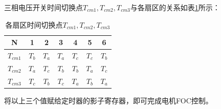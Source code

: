 \documentclass[main.tex]{subfiles}
\begin{document}
三相电压开关时间切换点$T_{cm1}, T_{cm2}, T_{cm3}$与各扇区的关系如表\ref{各扇区时间切换点}所示：

\begin{table}[H]
    \centering
    \begin{tabular}{c|c|c|c|c|c|c}
         \bottomrule
         N & 1 & 2 & 3 & 4 & 5 & 6 \\
         \hline
         $T_{cm1}$ & $T_b$ & $T_a$ & $T_a$ & $T_c$ & $T_c$ & $T_b$ \\
         \hline
         $T_{cm2}$ & $T_a$ & $T_c$ & $T_b$ & $T_b$ & $T_a$ & $T_c$ \\
         \hline
         $T_{cm3}$ & $T_c$ & $T_b$ & $T_c$ & $T_a$ & $T_b$ & $T_a$ \\
         \toprule
    \end{tabular}
    \caption{各扇区时间切换点$T_{cm1}, T_{cm2}, T_{cm3}$}
    \label{各扇区时间切换点}
\end{table}

将以上三个值赋给定时器的影子寄存器，即可完成电机FOC控制。
\end{document}
